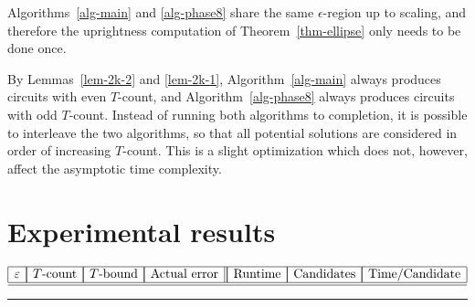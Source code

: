 \documentclass{article}
\begin{document}
\begin{remark}
  Algorithms~\ref{alg-main} and {\ref{alg-phase8}} share the same
  $\epsilon$-region up to scaling, and therefore the uprightness
  computation of Theorem~\ref{thm-ellipse} only needs to be done once. 
\end{remark}

\begin{remark}
  By Lemmas~\ref{lem-2k-2} and {\ref{lem-2k-1}},
  Algorithm~\ref{alg-main} always produces circuits with even
  $T$-count, and Algorithm~\ref{alg-phase8} always produces circuits
  with odd $T$-count. Instead of running both algorithms to
  completion, it is possible to interleave the two algorithms, so that
  all potential solutions are considered in order of increasing
  $T$-count. This is a slight optimization which does not, however,
  affect the asymptotic time complexity.
\end{remark}

\section{Experimental results}
\label{sec-experimental}

\begin{table}
\[
\begin{array}{|l|r|r|l||r|r|r|}
\hline
\multicolumn{1}{|c|}{\mbox{$\epsilon$}} &
\multicolumn{1}{|c|}{\mbox{$T$-count}} &
\multicolumn{1}{|c|}{\mbox{$T$-bound}} &
\multicolumn{1}{|c||}{\mbox{Actual error}} &
\multicolumn{1}{|c|}{\mbox{Runtime}} &
\multicolumn{1}{|c|}{\mbox{Candidates}} &
\multicolumn{1}{|c|}{\mbox{Time/Candidate}} \\\hline

\hline
\end{array}
\]
\caption{Experimental results. The first four columns report the
  $T$-count, computed lower bound on the $T$-count, and the actual error 
  for approximating the operator $\Rz(\pi/128)$ up to various $\epsilon$. 
  The remaining columns report the runtime for each $\epsilon$,
  averaged over 50 independent runs of Algorithm~\ref{alg-main} with
  random angles $\theta$. The runtime is further broken down into
  average number of candidates tried per run of the algorithm, and
  time spent per candidate.}
\label{tab-results}
\rule{\textwidth}{0.1mm}
\end{table}
\end{document}
